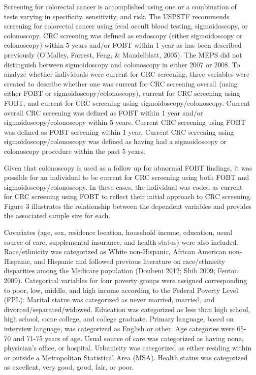 \documentclass[../main.tex]{subfiles}
\begin{document}
Screening for colorectal cancer is accomplished using one or a combination of tests varying in specificity, sensitivity, and risk. The USPSTF recommends screening for colorectal cancer using fecal occult blood testing, sigmoidoscopy, or colonoscopy. CRC screening was defıned as endoscopy (either sigmoidoscopy or colonoscopy) within 5 years and/or FOBT within 1 year as has been described previously (O'Malley, Forrest, Feng, \& Mandelblatt, 2005). The MEPS did not distinguish between sigmoidoscopy and colonoscopy in either 2007 or 2008. To analyze whether individuals were current for CRC screening, three variables were created to describe whether one was current for CRC screening overall (using either FOBT or sigmoidoscopy/colonoscopy), current for CRC screening using FOBT, and current for CRC screening using sigmoidoscopy/colonoscopy. Current overall CRC screening was defined as FOBT within 1 year and/or sigmoidoscopy/colonoscopy within 5 years. Current CRC screening using FOBT was defined as FOBT screening within 1 year. Current CRC screening using sigmoidoscopy/colonoscopy was defined as having had a sigmoidoscopy or colonoscopy procedure within the past 5 years.

Given that colonoscopy is used as a follow up for abnormal FOBT findings, it was possible for an individual to be current for CRC screening using both FOBT and sigmoidoscopy/colonoscopy. In these cases, the individual was coded as current for CRC screening using FOBT to reflect their initial approach to CRC screening. Figure 3 illustrates the relationship between the dependent variables and provides the associated sample size for each.

Covariates (age, sex, residence location, household income, education, usual source of care, supplemental insurance, and health status) were also included. Race/ethnicity was categorized as White non-Hispanic, African American non-Hispanic, and Hispanic and followed previous literature on race/ethnicity disparities among the Medicare population (Doubeni 2012; Shih 2009; Fenton 2009). Categorical variables for four poverty groups were assigned corresponding to poor, low, middle, and high income according to the Federal Poverty Level (FPL):
Marital status was categorized as never married, married, and divorced/separated/widowed. Education was categorized as less than high school, high school, some college, and college graduate. Primary language, based on interview language, was categorized as English or other. Age categories were 65-70 and 71-75 years of age. Usual source of care was categorized as having none, physician’s office, or hospital. Urbanicity was categorized as either residing within or outside a Metropolitan Statistical Area (MSA). Health status was categorized as excellent, very good, good, fair, or poor.
\end{document}
